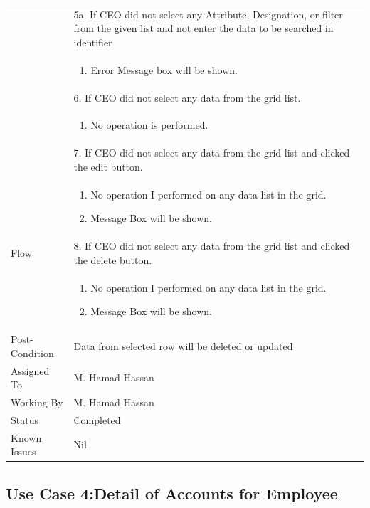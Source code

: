 \documentclass[12pt,a4paper]{article}
\begin{document}
\begin{longtable}{| p{3cm}|p{12cm}|}
& 5a. If CEO did not select any Attribute, Designation, or filter from the given list and not enter the data to be searched in identifier \\
& \begin{enumerate}
		\item Error Message box will be shown.
	\end{enumerate}
\\  
& 6. If CEO did not select any data from the grid list.  \\
& \begin{enumerate}
		\item No operation is performed.
	\end{enumerate}
\\ \hline  
& 7. If CEO did not select any data from the grid list and clicked the edit button.\\
& \begin{enumerate}
		\item No operation I performed on any data list in the grid.
            \item Message Box will be shown.
	\end{enumerate}
\\
Flow       & 8. If CEO did not select any data from the grid list and clicked the delete button.\\
 	&\begin{enumerate}
			\item No operation I performed on any data list in the grid.
            \item Message Box will be shown.
	\end{enumerate}
\\ \hline 


Post-Condition &  Data from selected row will be deleted or updated 
\\ \hline
Assigned To &  M. Hamad Hassan
\\ \hline
Working By &    M. Hamad Hassan
\\ \hline
Status & 	Completed	
\\ \hline
Known Issues & Nil
\\\hline

\end{longtable}
\subsection{Use Case 4:Detail of Accounts for Employee }
\end{document}

